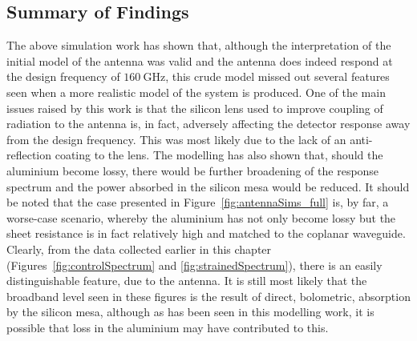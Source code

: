 \subsection{Summary of Findings}\label{ssec:antennaSims_con}
The above simulation work has shown that, although the interpretation of the initial model of the antenna was valid and the antenna does indeed respond at the design frequency of $160~\mathrm{GHz}$, this crude model missed out several features seen when a more realistic model of the system is produced. One of the main issues raised by this work is that the silicon lens used to improve coupling of radiation to the antenna is, in fact, adversely affecting the detector response away from the design frequency. This was most likely due to the lack of an anti-reflection coating to the lens. The modelling has also shown that, should the aluminium become lossy, there would be further broadening of the response spectrum and the power absorbed in the silicon mesa would be reduced. It should be noted that the case presented in Figure~\ref{fig:antennaSims_full} is, by far, a worse-case scenario, whereby the aluminium has not only become lossy but the sheet resistance is in fact relatively high and matched to the coplanar waveguide. Clearly, from the data collected earlier in this chapter (Figures~\ref{fig:controlSpectrum} and \ref{fig:strainedSpectrum}), there is an easily distinguishable feature, due to the antenna. It is still most likely that the broadband level seen in these figures is the result of direct, bolometric, absorption by the silicon mesa, although as has been seen in this modelling work, it is possible that loss in the aluminium may have contributed to this.
%
